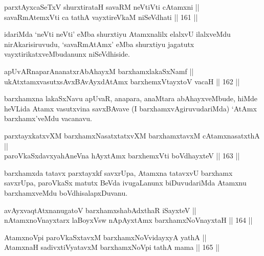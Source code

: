 \begin{shl}
parxtAyxcaSeTxV shurxtirataH savaRM neVtiVti cA\s \s tamxni || \\
savaRmAtemxVti ca tathA vayxtireVkaM niSeVdhati \hfill || 161 ||  
\end{shl}

\begin{artha}
idariMda `neVti neVti' eMba shurxtiyu Atamxnalilx elalxvU ilalxveMdu
nirAkarisiruvudu, `savaRmAtAmx' eMba shurxtiyu jagatutx
vayxtirikatxveMbudanunx niSeVdhiside.
\end{artha}

\begin{shl}
apUvARnaparAnanatxrAbAhayxM barxhamxlakaSxNamf || \\
ukAtxtamxvasutxsAvxBAvAyxdAtAmx barxhemxVtayxtoV vacaH \hfill || 162 ||  
\end{shl}

\begin{artha}
barxhamxna lakaSxNavu apUvaR, anapara, anaMtara abAhayxveMbude, hiMde
heVLida Atamx vasutxvina savxBAvave (I barxhamxvAgiruvudariMda) `AtAmx
barxhamx'veMdu vacanavu.
\end{artha}

\begin{shl}
parxtayxkatxvXM barxhamxNasatxtatxvXM barxhamxtavxM cA\s \s tamxnasatxthA || \\
paroVkaSxdavxyahAneVna hAyxtAmx barxhemxVti boVdhayxteV \hfill || 163 ||  
\end{shl}

\begin{artha}
barxhamxda tatavx parxtayxkf savxrUpa, Atamxna tatavxvU barxhamx
savxrUpa, paroVkaSx matutx BeVda ivugaLanunx biDuvudariMda Atamxnu
barxhamxveMdu boVdhisalapxDuvanu.
\end{artha}


\begin{shl}
avAyxvaqtAtxnanugatoV barxhamxshabAdxthaR iSayxteV ||  \\
nA\s \s tamxnoV\s nayxtarx laBoyxV\s sw nApAyxtAmx barxhamxNoV\s nayxtaH \hfill || 164 ||  
\end{shl}

\begin{shl}
AtamxnoV\s pi paroVkaSxtavxM barxhamxNoV\s vidayxyA yathA || \\
AtamxnaH sadivxtiVyatavxM barxhamxNoV\s pi tathA mama \hfill || 165 ||  
\end{shl}

